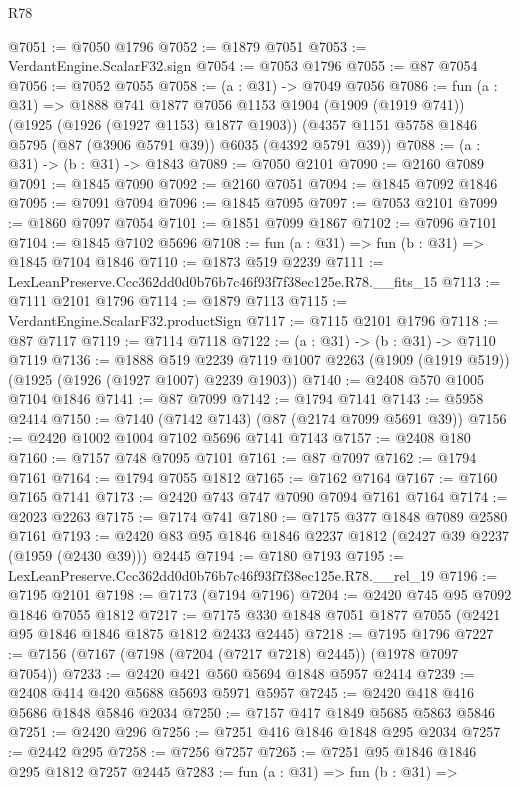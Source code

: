 \begin{lexlean}{R78}
\begin{coremodule}
@7051 := @7050 @1796
@7052 := @1879 @7051
@7053 := VerdantEngine.ScalarF32.sign
@7054 := @7053 @1796
@7055 := @87 @7054
@7056 := @7052 @7055
@7058 := (a : @31) -> @7049 @7056
@7086 := fun (a : @31) =>
  @1888
    @741
    @1877
    @7056
    @1153
    @1904
    (@1909 (@1919 @741))
    (@1925 (@1926 (@1927 @1153) @1877 @1903))
    (@4357 @1151 @5758 @1846 @5795 (@87 (@3906 @5791 @39)) @6035 (@4392 @5791 @39))
@7088 := (a : @31) -> (b : @31) -> @1843
@7089 := @7050 @2101
@7090 := @2160 @7089
@7091 := @1845 @7090
@7092 := @2160 @7051
@7094 := @1845 @7092 @1846
@7095 := @7091 @7094
@7096 := @1845 @7095
@7097 := @7053 @2101
@7099 := @1860 @7097 @7054
@7101 := @1851 @7099 @1867
@7102 := @7096 @7101
@7104 := @1845 @7102 @5696
@7108 := fun (a : @31) => fun (b : @31) => @1845 @7104 @1846
@7110 := @1873 @519 @2239
@7111 := LexLeanPreserve.Ccc362dd0d0b76b7c46f93f7f38ec125e.R78.__fits_15
@7113 := @7111 @2101 @1796
@7114 := @1879 @7113
@7115 := VerdantEngine.ScalarF32.productSign
@7117 := @7115 @2101 @1796
@7118 := @87 @7117
@7119 := @7114 @7118
@7122 := (a : @31) -> (b : @31) -> @7110 @7119
@7136 := @1888
    @519
    @2239
    @7119
    @1007
    @2263
    (@1909 (@1919 @519))
    (@1925 (@1926 (@1927 @1007) @2239 @1903))
@7140 := @2408 @570 @1005 @7104 @1846
@7141 := @87 @7099
@7142 := @1794 @7141
@7143 := @5958 @2414
@7150 := @7140 (@7142 @7143) (@87 (@2174 @7099 @5691 @39))
@7156 := @2420 @1002 @1004 @7102 @5696 @7141 @7143
@7157 := @2408 @180
@7160 := @7157 @748 @7095 @7101
@7161 := @87 @7097
@7162 := @1794 @7161
@7164 := @1794 @7055 @1812
@7165 := @7162 @7164
@7167 := @7160 @7165 @7141
@7173 := @2420 @743 @747 @7090 @7094 @7161 @7164
@7174 := @2023 @2263
@7175 := @7174 @741
@7180 := @7175 @377 @1848 @7089 @2580 @7161
@7193 := @2420 @83 @95 @1846 @1846 @2237 @1812 (@2427 @39 @2237 (@1959 (@2430 @39))) @2445
@7194 := @7180 @7193
@7195 := LexLeanPreserve.Ccc362dd0d0b76b7c46f93f7f38ec125e.R78.__rel_19
@7196 := @7195 @2101
@7198 := @7173 (@7194 @7196)
@7204 := @2420 @745 @95 @7092 @1846 @7055 @1812
@7217 := @7175 @330 @1848 @7051 @1877 @7055 (@2421 @95 @1846 @1846 @1875 @1812 @2433 @2445)
@7218 := @7195 @1796
@7227 := @7156 (@7167 (@7198 (@7204 (@7217 @7218) @2445)) (@1978 @7097 @7054))
@7233 := @2420 @421 @560 @5694 @1848 @5957 @2414
@7239 := @2408 @414 @420 @5688 @5693 @5971 @5957
@7245 := @2420 @418 @416 @5686 @1848 @5846 @2034
@7250 := @7157 @417 @1849 @5685 @5863 @5846
@7251 := @2420 @296
@7256 := @7251 @416 @1846 @1848 @295 @2034
@7257 := @2442 @295
@7258 := @7256 @7257
@7265 := @7251 @95 @1846 @1846 @295 @1812 @7257 @2445
@7283 := fun (a : @31) =>
  fun (b : @31) =>

\end{coremodule}
\end{lexlean}
